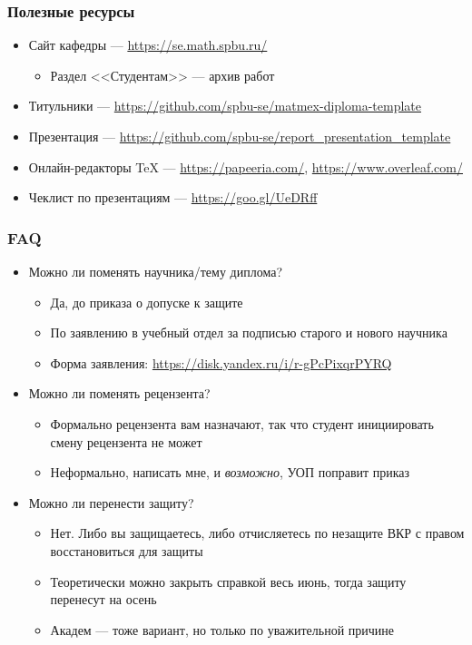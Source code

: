 \documentclass[xetex,mathserif,serif]{beamer}
\begin{document}
    \begin{frame}
        \frametitle{Полезные ресурсы}
        \begin{itemize}
            \item Сайт кафедры --- \url{https://se.math.spbu.ru/}
            \begin{itemize}
                \item Раздел <<Студентам>> --- архив работ
            \end{itemize}
            \item Титульники --- \url{https://github.com/spbu-se/matmex-diploma-template}
            \item Презентация --- \url{https://github.com/spbu-se/report_presentation_template}
            \item Онлайн-редакторы TeX --- \url{https://papeeria.com/}, \url{https://www.overleaf.com/}
            \item Чеклист по презентациям --- \url{https://goo.gl/UeDRff}
        \end{itemize}
    \end{frame}

    \begin{frame}
        \frametitle{FAQ}
        \begin{itemize}
            \item Можно ли поменять научника/тему диплома?
            \begin{itemize}
                \item Да, до приказа о допуске к защите
                \item По заявлению в учебный отдел за подписью старого и нового научника 
                \item Форма заявления: \url{https://disk.yandex.ru/i/r-gPcPixqrPYRQ}
            \end{itemize}
            \item Можно ли поменять рецензента?
            \begin{itemize}
                \item Формально рецензента вам назначают, так что студент инициировать смену рецензента не может
                \item Неформально, написать мне, и \textit{возможно}, УОП поправит приказ
            \end{itemize}
            \item Можно ли перенести защиту?
            \begin{itemize}
                \item Нет. Либо вы защищаетесь, либо отчисляетесь по незащите ВКР с правом восстановиться для защиты
                \item Теоретически можно закрыть справкой весь июнь, тогда защиту перенесут на осень
                \item Академ --- тоже вариант, но только по уважительной причине
            \end{itemize}
        \end{itemize}
    \end{frame}
\end{document}
